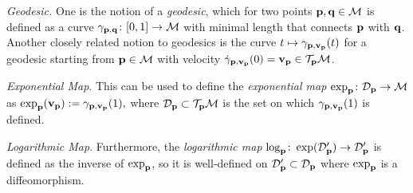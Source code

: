 \textit{Geodesic.} One is the notion of a \emph{geodesic}, which for two points $\mathbf{p},\mathbf{q} \in \mathcal{M}$ is defined as a curve $\gamma_{\mathbf{p},\mathbf{q}} \colon [0,1] \to \mathcal{M}$ with minimal length that connects $\mathbf{p}$ with $\mathbf{q}$. Another closely related notion to geodesics is the curve $t \mapsto \gamma_{\mathbf{p},\mathbf{v}_{\mathbf{p}}}(t)$  for a geodesic starting from $\mathbf{p}\in\mathcal{M}$ with velocity $\dot{\gamma}_{\mathbf{p},\mathbf{v}_{\mathbf{p}}} (0) = \mathbf{v}_{\mathbf{p}} \in \mathcal{T}_{\mathbf{p}}\mathcal{M}$. 

\textit{Exponential Map}. This can be used to define the \emph{exponential map} $\exp_{\mathbf{p}} \colon \mathcal{D}_{\mathbf{p}} \to \mathcal{M}$ as \(\exp_{\mathbf{p}}(\mathbf{v}_{\mathbf{p}}) := \gamma_{\mathbf{p},\mathbf{v}_{\mathbf{p}}}(1),\) where \(\mathcal{D}_{\mathbf{p}} \subset \mathcal{T}_{\mathbf{p}} \mathcal{M}\) is the set on which \(\gamma_{\mathbf{p},\mathbf{v}_{\mathbf{p}}}(1)\) is defined.

\textit{Logarithmic Map}. Furthermore, the \emph{logarithmic map} $\log_{\mathbf{p}} \colon \exp(\mathcal{D}'_{\mathbf{p}} ) \to \mathcal{D}'_{\mathbf{p}}$ is defined as the inverse of $\exp_{\mathbf{p}}$, so it is well-defined on  $\mathcal{D}'_{\mathbf{p}} \subset \mathcal{D}_{\mathbf{p}}$ where $\exp_{\mathbf{p}}$ is a diffeomorphism. 



